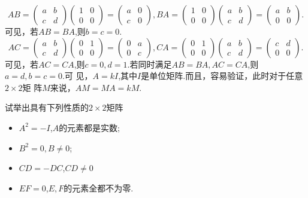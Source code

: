 ﻿\documentclass{book} \usepackage{exsheets} \usepackage{xeCJK}
\begin{document}
\begin{solution}
  $$ 
  AB=
  \begin{pmatrix}
    a&b\\
    c&d
  \end{pmatrix}
  \begin{pmatrix}
    1&0\\
    0&0
  \end{pmatrix}=
  \begin{pmatrix}
    a&0\\
    c&0
  \end{pmatrix},BA=
  \begin{pmatrix}
    1&0\\
    0&0
  \end{pmatrix}
  \begin{pmatrix}
    a&b\\
    c&d
  \end{pmatrix}=
  \begin{pmatrix}
    a&b\\
    0&0
  \end{pmatrix}.
 $$
 可见，若$AB=BA$,则$b=c=0$.
$$
AC=
\begin{pmatrix}
  a&b\\
  c&d
\end{pmatrix}
\begin{pmatrix}
  0&1\\
  0&0
\end{pmatrix}=
\begin{pmatrix}
  0&a\\
  0&c
\end{pmatrix},CA=
\begin{pmatrix}
  0&1\\
  0&0
\end{pmatrix}
\begin{pmatrix}
  a&b\\
  c&d
\end{pmatrix}=
\begin{pmatrix}
  c&d \\
  0&0
\end{pmatrix}.
$$
可见，若$AC=CA$,则$c=0,d=1$.若同时满足$AB=BA,AC=CA$,则$a=d,b=c=0$.可
见，$A=kI$,其中$I$是单位矩阵.而且，容易验证，此时对于任意$2\times 2$矩
阵$M$来说，$AM=MA=kM$.
\end{solution}
\begin{question}
  试举出具有下列性质的$2\times 2$矩阵
  \begin{itemize}
  \item $A^2=-I$,$A$的元素都是实数;
  \item $B^2=0,B\neq 0$;
  \item {\color{red}$CD=-DC$,$CD\neq 0$}
  \item $EF=0$,$E,F$的元素全都不为零.
  \end{itemize}
\end{question}
\end{document}
